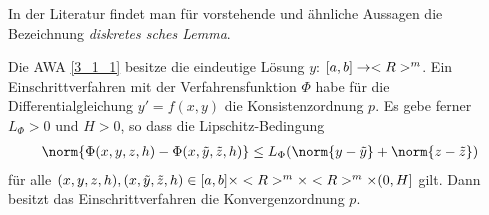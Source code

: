 In der Literatur findet man für vorstehende und ähnliche Aussagen die Bezeichnung \textit{diskretes sches Lemma}.

\begin{proposition}
	Die AWA \cref{3_1_1} besitze die eindeutige Lösung $y$: $[a,b]\to<R>^m$. Ein Einschrittverfahren mit der Verfahrensfunktion $\Phi$ habe für die Differentialgleichung $y'=f(x,y)$ die Konsistenzordnung $p$. Es gebe ferner $L_\Phi>0$ und $H>0$, so dass die Lipschitz-Bedingung
	\begin{align}
		\label{3_1_6}
		\norm{\Phi(x,y,z,h) - \Phi(x,\tilde{y},\tilde{z},h)} \le L_\Phi(\norm{y-\tilde{y}} + \norm{z-\tilde{z}})
	\end{align}
	für alle $(x,y,z,h),(x,\tilde{y},\tilde{z},h)\in [a,b]\times <R>^m\times <R>^m\times (0,H]$ gilt. Dann besitzt das Einschrittverfahren die Konvergenzordnung $p$.
\end{proposition}

